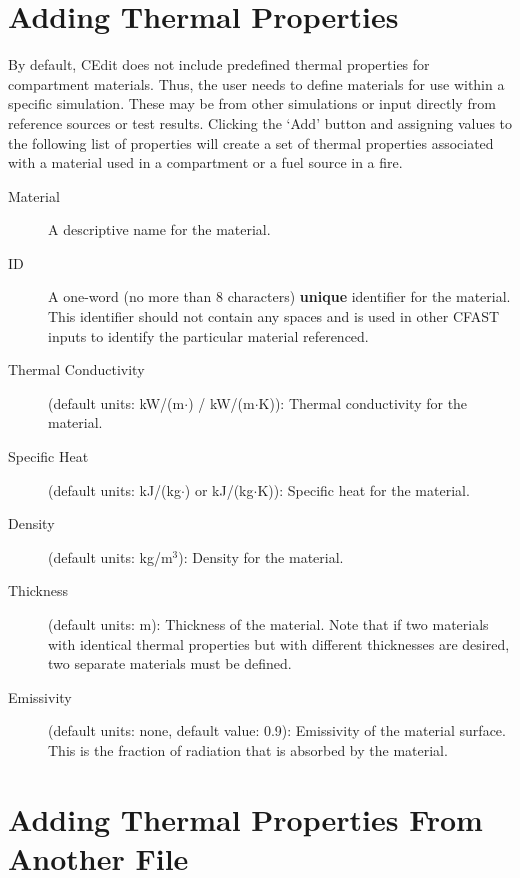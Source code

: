 \section{Adding Thermal Properties}
\label{info:MATL}

By default, CEdit does not include predefined thermal properties for compartment materials. Thus, the user needs to define materials for use within a specific simulation. These may be from other simulations or input directly from reference sources or test results. Clicking the `Add' button and assigning values to the following list of properties will create a set of thermal properties associated with a material used in a compartment or a fuel source in a fire.

\begin{description}
\item[Material] A descriptive name for the material.

\item[ID] A one-word (no more than 8 characters) \textbf{unique} identifier for the material.  This identifier should not contain any spaces and is used in other CFAST inputs to identify the particular material referenced.

\item[Thermal Conductivity] (default units: kW/(m$\cdot$\degc) / kW/(m$\cdot$K)): Thermal conductivity for the material.

\item[Specific Heat] (default units: kJ/(kg$\cdot$\degc) or kJ/(kg$\cdot$K)): Specific heat for the material.

\item[Density] (default units: kg/m$^3$): Density for the material.

\item[Thickness] (default units: m): Thickness of the material.  Note that if two materials with identical thermal properties but with different thicknesses are desired, two separate materials must be defined.

\item[Emissivity] (default units: none, default value: 0.9): Emissivity of the material surface.  This is the fraction of radiation that is absorbed by the material.
\end{description}




\section{Adding Thermal Properties From Another File}

